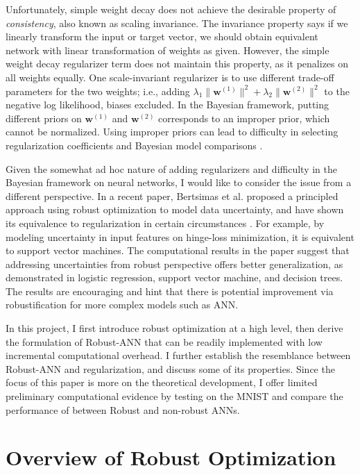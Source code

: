 \documentclass[twoside,12pt]{article}
\newcommand{\M}[1]{\boldsymbol{\mathbf{#1}}}
\begin{document}
Unfortunately, simple weight decay does not achieve the desirable property of \emph{consistency}, also known as scaling invariance. The invariance property says if we linearly transform the input or target vector, we should obtain equivalent network with linear transformation of weights as given. However, the simple weight decay regularizer term does not maintain this property, as it penalizes on all weights equally. One scale-invariant regularizer is to use different trade-off parameters for the two weights; i.e., adding $\lambda_1 \| \M w^{(1)}\|^2 + \lambda_2 \| \M w^{(2)}\|^2$ to the negative log likelihood, biases excluded. In the Bayesian framework, putting different priors on $\M w^{(1)}$ and $\M w^{(2)}$ corresponds to an improper prior, which cannot be normalized. Using improper priors can lead to difficulty in selecting regularization coefficients and Bayesian model comparisons \cite{bishop2006pattern}.

Given the somewhat ad hoc nature of adding regularizers and difficulty in the Bayesian framework on neural networks, I would like to consider the issue from a different perspective. In a recent paper, Bertsimas et al. proposed a principled approach using robust optimization to model data uncertainty, and have shown its equivalence to regularization in certain circumstances \cite{bertsimas2015robust}. For example, by modeling uncertainty in input features  on hinge-loss minimization, it is equivalent to support vector machines. The computational results in the paper suggest that addressing uncertainties from robust perspective offers better generalization, as demonstrated in logistic regression, support vector machine, and decision trees. The results are encouraging and hint that there is potential improvement via robustification for more complex models such as ANN.

In this project, I first introduce robust optimization at a high level, then derive the formulation of Robust-ANN that can be readily implemented with low incremental computational overhead. I further establish the resemblance between Robust-ANN and regularization, and discuss some of its properties. Since the focus of this paper is more on the theoretical development, I offer limited preliminary computational evidence by testing on the MNIST and compare the performance of between Robust and non-robust ANNs.


\section{Overview of Robust Optimization}
\end{document}
